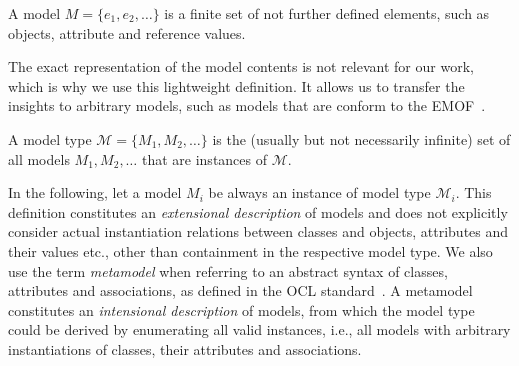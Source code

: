 



\begin{definition}[Model]
A model $M = \{e_1, e_2, \ldots\}$ is a finite set of not further defined elements, such as objects, attribute and reference values.
\end{definition}

The exact representation of the model contents is not relevant for our work, which is why we use this lightweight definition. 
It allows us to transfer the insights to arbitrary models, such as models that are conform to the \ac{EMOF}~\cite{mof}.

\begin{definition}
A model type $\mathcal{M} = \{M_1, M_2, \dots\}$ is the (usually but not necessarily infinite) set of all models $M_1, M_2, \dots$ that are instances of $\mathcal{M}$.
\end{definition}

In the following, let a model $M_i$ be always an instance of model type $\mathcal{M}_i$.
This definition constitutes an \emph{extensional description} of models and does not explicitly consider actual instantiation relations between classes and objects, attributes and their values etc., other than containment in the respective model type. 
We also use the term \emph{metamodel} when referring to an abstract syntax of classes, attributes and associations, as defined in the OCL standard~\cite[A.1]{ocl}. 
A metamodel constitutes an \emph{intensional description} of models, from which the model type could be derived by enumerating all valid instances, i.e., all models with arbitrary instantiations of classes, their attributes and associations.

